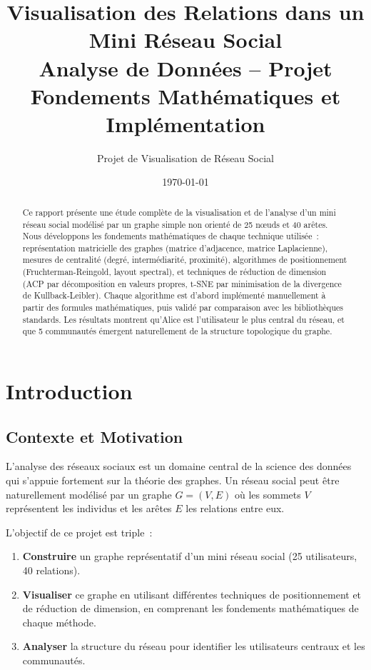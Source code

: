 \documentclass[12pt,a4paper]{article}
\title{
    \vspace{-1cm}
    \textbf{Visualisation des Relations dans un Mini Réseau Social} \\[0.5cm]
    \large Analyse de Données -- Projet \\[0.3cm]
    \normalsize Fondements Mathématiques et Implémentation
}
\author{Projet de Visualisation de Réseau Social}
\date{\today}
\begin{document}
\maketitle

\begin{abstract}
Ce rapport présente une étude complète de la visualisation et de l'analyse d'un mini réseau social modélisé par un graphe simple non orienté de 25 n\oe{}uds et 40 arêtes. Nous développons les fondements mathématiques de chaque technique utilisée~: représentation matricielle des graphes (matrice d'adjacence, matrice Laplacienne), mesures de centralité (degré, intermédiarité, proximité), algorithmes de positionnement (Fruchterman-Reingold, layout spectral), et techniques de réduction de dimension (ACP par décomposition en valeurs propres, t-SNE par minimisation de la divergence de Kullback-Leibler). Chaque algorithme est d'abord implémenté manuellement à partir des formules mathématiques, puis validé par comparaison avec les bibliothèques standards. Les résultats montrent qu'Alice est l'utilisateur le plus central du réseau, et que 5 communautés émergent naturellement de la structure topologique du graphe.
\end{abstract}

\tableofcontents
\newpage

\section{Introduction}

\subsection{Contexte et Motivation}

L'analyse des réseaux sociaux est un domaine central de la science des données qui s'appuie fortement sur la théorie des graphes. Un réseau social peut être naturellement modélisé par un graphe $G = (V, E)$ où les sommets $V$ représentent les individus et les arêtes $E$ les relations entre eux.

L'objectif de ce projet est triple~:
\begin{enumerate}
    \item \textbf{Construire} un graphe représentatif d'un mini réseau social (25 utilisateurs, 40 relations).
    \item \textbf{Visualiser} ce graphe en utilisant différentes techniques de positionnement et de réduction de dimension, en comprenant les fondements mathématiques de chaque méthode.
    \item \textbf{Analyser} la structure du réseau pour identifier les utilisateurs centraux et les communautés.
\end{enumerate}
\end{document}
